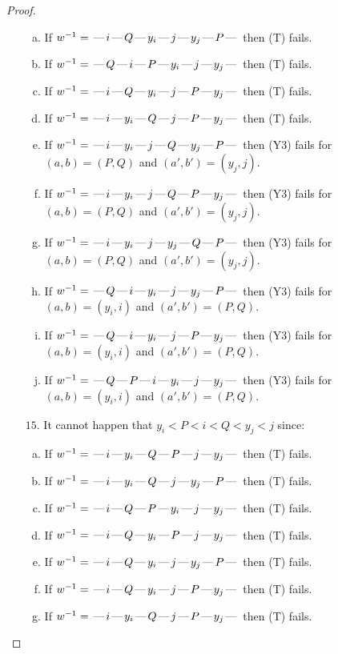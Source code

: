 \documentclass[10pt]{article}
\theoremstyle{definition}
\theoremstyle{definition}
\def\dash{\text{\hspace{0.5mm}---\hspace{0.5mm}}}
\begin{document}
\begin{proof}
\begin{enumerate}
\begin{enumerate}[(a)]
\item If $w^{-1} = \dash i\dash Q\dash y_i\dash j\dash y_j\dash P\dash $ then (T) fails.
\item If $w^{-1} = \dash Q\dash i\dash P\dash y_i\dash j\dash y_j\dash $ then (T) fails.
\item If $w^{-1} = \dash i\dash Q\dash y_i\dash j\dash P\dash y_j\dash $ then (T) fails.
\item If $w^{-1} = \dash i\dash y_i\dash Q\dash j\dash P\dash y_j\dash $ then (T) fails.
\item If $w^{-1} = \dash i\dash y_i\dash j\dash Q\dash y_j\dash P\dash $ then (Y3) fails for $(a,b)=(P,Q)$ and $(a',b')=(y_j,j)$.
\item If $w^{-1} = \dash i\dash y_i\dash j\dash Q\dash P\dash y_j\dash $ then (Y3) fails for $(a,b)=(P,Q)$ and $(a',b')=(y_j,j)$.
\item If $w^{-1} = \dash i\dash y_i\dash j\dash y_j\dash Q\dash P\dash $ then (Y3) fails for $(a,b)=(P,Q)$ and $(a',b')=(y_j,j)$.
\item If $w^{-1} = \dash Q\dash i\dash y_i\dash j\dash y_j\dash P\dash $ then (Y3) fails for $(a,b)=(y_i,i)$ and $(a',b')=(P,Q)$.
\item If $w^{-1} = \dash Q\dash i\dash y_i\dash j\dash P\dash y_j\dash $ then (Y3) fails for $(a,b)=(y_i,i)$ and $(a',b')=(P,Q)$.
\item If $w^{-1} = \dash Q\dash P\dash i\dash y_i\dash j\dash y_j\dash $ then (Y3) fails for $(a,b)=(y_i,i)$ and $(a',b')=(P,Q)$.
\end{enumerate}
\item[$15$.] It cannot happen that $y_i < P < i < Q < y_j < j$ since:
\begin{enumerate}[(a)]
\item If $w^{-1} = \dash i\dash y_i\dash Q\dash P\dash j\dash y_j\dash $ then (T) fails.
\item If $w^{-1} = \dash i\dash y_i\dash Q\dash j\dash y_j\dash P\dash $ then (T) fails.
\item If $w^{-1} = \dash i\dash Q\dash P\dash y_i\dash j\dash y_j\dash $ then (T) fails.
\item If $w^{-1} = \dash i\dash Q\dash y_i\dash P\dash j\dash y_j\dash $ then (T) fails.
\item If $w^{-1} = \dash i\dash Q\dash y_i\dash j\dash y_j\dash P\dash $ then (T) fails.
\item If $w^{-1} = \dash i\dash Q\dash y_i\dash j\dash P\dash y_j\dash $ then (T) fails.
\item If $w^{-1} = \dash i\dash y_i\dash Q\dash j\dash P\dash y_j\dash $ then (T) fails.

\end{enumerate}
\end{enumerate}
\end{proof}
\end{document}
